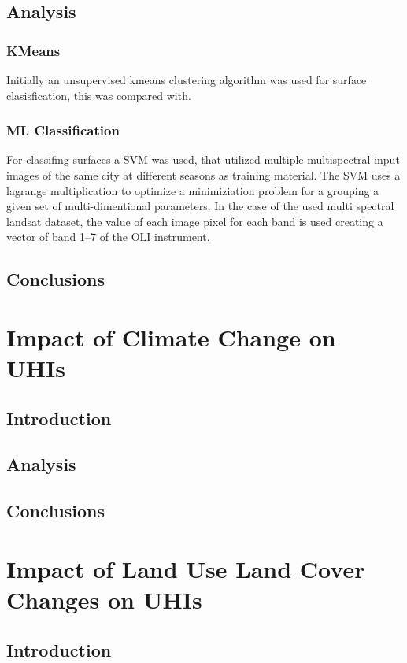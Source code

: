 \documentclass[a4paper, english]{article}
\begin{document}
    \subsection{Analysis}
    \subsubsection{KMeans}\label{sec:kmeans}
    Initially an unsupervised kmeans clustering algorithm was used for surface clasisfication, this was compared with. 
    
    \subsubsection{ML Classification }\label{sec:svm}
    For classifing surfaces a \gls{SVM} was used, that utilized multiple multispectral input images of the same city at different seasons as training material.
    The SVM uses a lagrange multiplication to optimize a minimiziation problem for a grouping a given set of multi-dimentional parameters. 
    In the case of the used multi spectral landsat dataset, the value of each image pixel for each band is used creating a vector of band 1--7 of the OLI instrument. 
    \subsection{Conclusions}
    

\section{Impact of Climate Change on UHIs}
    \subsection{Introduction}
    \subsection{Analysis}
    \subsection{Conclusions}

\section{Impact of Land Use Land Cover Changes on UHIs}
    \subsection{Introduction}
\end{document}
